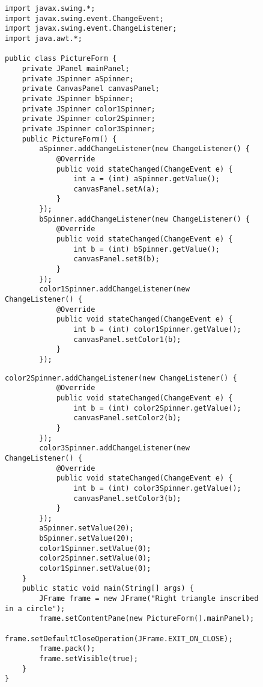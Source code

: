 \documentclass[a4paper, 14pt]{extarticle}
\begin{document}
\begin{figure}[!htb]
\begin{lstlisting}[language={},caption={класс PictureForm},label={lst:code1}]
import javax.swing.*;
import javax.swing.event.ChangeEvent;
import javax.swing.event.ChangeListener;
import java.awt.*;

public class PictureForm {
    private JPanel mainPanel;
    private JSpinner aSpinner;
    private CanvasPanel canvasPanel;
    private JSpinner bSpinner;
    private JSpinner color1Spinner;
    private JSpinner color2Spinner;
    private JSpinner color3Spinner;
    public PictureForm() {
        aSpinner.addChangeListener(new ChangeListener() {
            @Override
            public void stateChanged(ChangeEvent e) {
                int a = (int) aSpinner.getValue();
                canvasPanel.setA(a);
            }
        });
        bSpinner.addChangeListener(new ChangeListener() {
            @Override
            public void stateChanged(ChangeEvent e) {
                int b = (int) bSpinner.getValue();
                canvasPanel.setB(b);
            }
        });
        color1Spinner.addChangeListener(new ChangeListener() {
            @Override
            public void stateChanged(ChangeEvent e) {
                int b = (int) color1Spinner.getValue();
                canvasPanel.setColor1(b);
            }
        });
\end{lstlisting}
\end{figure}

\begin{figure}[!htb]
\begin{lstlisting}[language={},caption={класс PictureForm(продолжение)},label={lst:code2}]
        color2Spinner.addChangeListener(new ChangeListener() {
            @Override
            public void stateChanged(ChangeEvent e) {
                int b = (int) color2Spinner.getValue();
                canvasPanel.setColor2(b);
            }
        });
        color3Spinner.addChangeListener(new ChangeListener() {
            @Override
            public void stateChanged(ChangeEvent e) {
                int b = (int) color3Spinner.getValue();
                canvasPanel.setColor3(b);
            }
        });
        aSpinner.setValue(20);
        bSpinner.setValue(20);
        color1Spinner.setValue(0);
        color2Spinner.setValue(0);
        color1Spinner.setValue(0);
    }
    public static void main(String[] args) {
        JFrame frame = new JFrame("Right triangle inscribed in a circle");
        frame.setContentPane(new PictureForm().mainPanel);
        frame.setDefaultCloseOperation(JFrame.EXIT_ON_CLOSE);
        frame.pack();
        frame.setVisible(true);
    }
}
\end{lstlisting}
\end{figure}
\end{document}
